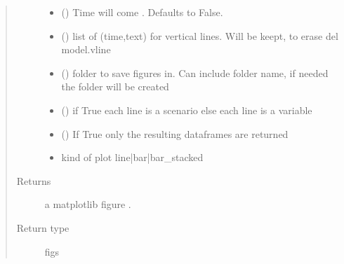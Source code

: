 \documentclass[letterpaper,10pt,english]{sphinxmanual}
\begin{document}
\begin{fulllineitems}
\begin{fulllineitems}
\begin{quote}
\begin{description}
\begin{itemize}
\item {} 
\sphinxAtStartPar
{} (\sphinxstyleliteralemphasis{\sphinxupquote{, }}) \textendash{} Time will come . Defaults to False.

\item {} 
\sphinxAtStartPar
{} (\sphinxstyleliteralemphasis{\sphinxupquote{, }}) \textendash{} list of (time,text) for vertical lines. Will be keept, to erase del model.vline

\item {} 
\sphinxAtStartPar
{} (\sphinxstyleliteralemphasis{\sphinxupquote{,}}) \textendash{} folder to save figures in. Can include folder name, if needed the folder will be created

\item {} 
\sphinxAtStartPar
{} (\sphinxstyleliteralemphasis{\sphinxupquote{,}}) \textendash{} if True each line is a scenario else each line is a variable

\item {} 
\sphinxAtStartPar
{} () \textendash{} If True only the resulting dataframes are returned

\item {} 
\sphinxAtStartPar
{} \textendash{} kind of  plot line|bar|bar\_stacked

\end{itemize}

\item[{Returns}] \leavevmode
\sphinxAtStartPar
a matplotlib figure .

\item[{Return type}] \leavevmode
\sphinxAtStartPar
figs

\end{description}\end{quote}

\end{fulllineitems}


\end{fulllineitems}
\end{document}
